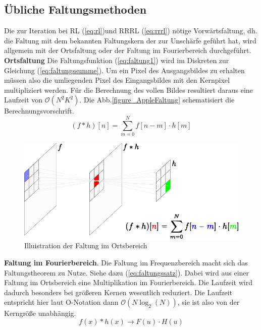 \documentclass[a4paper,12pt]{article}
\begin{document}
\subsection{Übliche Faltungsmethoden}\label{chp:faltungen}
Die zur Iteration bei RL (\ref{eq:rl})und RRRL (\ref{eq:rrrl}) nötige
Vorwärtsfaltung, dh. die Faltung mit dem bekannten Faltungskern der zur
Unschärfe geführt hat, wird allgemein mit der Ortsfaltung oder der Faltung
im Fourierbereich durchgeführt.\\
\textbf{Ortsfaltung} Die Faltungsfunktion (\ref{eq:faltung1}) wird im Diskreten
zur Gleichung (\ref{eq:faltungssumme}). Um ein Pixel des Ausgangsbildes zu
erhalten müssen also die umliegenden Pixel des Eingangsbildes mit den Kernpixel
multipliziert werden. Für die Berechnung des vollen Bildes resultiert daraus
eine Laufzeit von $\mathcal O(N^2K^2)$. Die Abb.\ref{figure_AppleFaltung}
schematisiert die Berechnungsvorschrift.
\begin{equation} \label{eq:faltungssumme}
(f*h)[n] = \sum_{m=0}^{N} {f[n-m] \cdot h[m]}
\end{equation}

\begin{figure}[htbp]
\centering
\includegraphics[scale=1.0]{faltung_illustration.png}
\caption{Illuistration der Faltung im Ortsbereich}%
\label{figure_IlluFaltung}
\end{figure}
 
\textbf{Faltung im Fourierbereich}. Die Faltung im Frequenzbereich macht
sich das Faltungstheorem zu Nutze. Siehe dazu (\ref{eq:faltungssatz}). Dabei wird aus
einer Faltung im Ortsbereich eine Multiplikation im Fourierbereich. Die Laufzeit
wird dadurch besonders bei größeren Kernen wesentlich reduziert. Die Laufzeit
entspricht hier laut O-Notation dann $\mathcal O(N\log_2 (N))$, sie ist also von
der Kerngröße unabhängig.
\begin{equation} \label{eq:faltungssatz}
f(x) * h(x) \rightarrow F(u) \cdot H(u)  
\end{equation}
 
\end{document}
